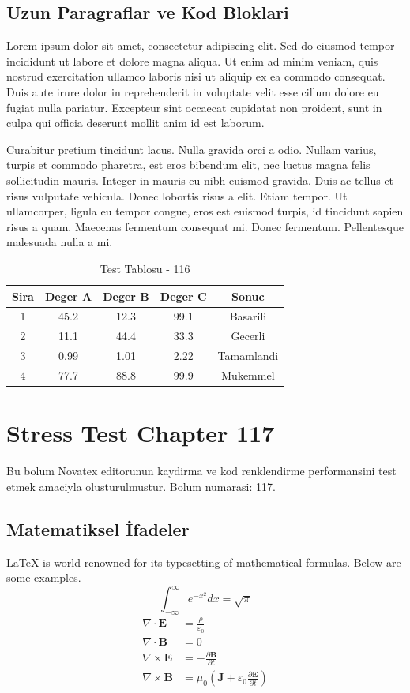 \documentclass[12pt,a4paper]{article}
\begin{document}
\subsection{Uzun Paragraflar ve Kod Bloklari}
Lorem ipsum dolor sit amet, consectetur adipiscing elit. Sed do eiusmod tempor incididunt ut labore et dolore magna aliqua. Ut enim ad minim veniam, quis nostrud exercitation ullamco laboris nisi ut aliquip ex ea commodo consequat. Duis aute irure dolor in reprehenderit in voluptate velit esse cillum dolore eu fugiat nulla pariatur. Excepteur sint occaecat cupidatat non proident, sunt in culpa qui officia deserunt mollit anim id est laborum.

Curabitur pretium tincidunt lacus. Nulla gravida orci a odio. Nullam varius, turpis et commodo pharetra, est eros bibendum elit, nec luctus magna felis sollicitudin mauris. Integer in mauris eu nibh euismod gravida. Duis ac tellus et risus vulputate vehicula. Donec lobortis risus a elit. Etiam tempor. Ut ullamcorper, ligula eu tempor congue, eros est euismod turpis, id tincidunt sapien risus a quam. Maecenas fermentum consequat mi. Donec fermentum. Pellentesque malesuada nulla a mi.

\begin{table}[h!]
\centering
\begin{tabular}{|c|c|c|c|c|}
\hline
\textbf{Sira} & \textbf{Deger A} & \textbf{Deger B} & \textbf{Deger C} & \textbf{Sonuc} \\
\hline
1 & 45.2 & 12.3 & 99.1 & Basarili \\
2 & 11.1 & 44.4 & 33.3 & Gecerli \\
3 & 0.99 & 1.01 & 2.22 & Tamamlandi \\
4 & 77.7 & 88.8 & 99.9 & Mukemmel \\
\hline
\end{tabular}
\caption{Test Tablosu - 116}
\end{table}

\newpage
\section{Stress Test Chapter 117}
Bu bolum Novatex editorunun kaydirma ve kod renklendirme performansini test etmek amaciyla olusturulmustur. Bolum numarasi: 117.

\subsection{Matematiksel İfadeler}
\LaTeX{} is world-renowned for its typesetting of mathematical formulas. Below are some examples.
\begin{equation}
\int_{-\infty}^{\infty} e^{-x^2} dx = \sqrt{\pi}
\end{equation}
\begin{align}
\nabla \cdot \mathbf{E} &= \frac{\rho}{\varepsilon_0} \\
\nabla \cdot \mathbf{B} &= 0 \\
\nabla \times \mathbf{E} &= -\frac{\partial \mathbf{B}}{\partial t} \\
\nabla \times \mathbf{B} &= \mu_0\left(\mathbf{J} + \varepsilon_0 \frac{\partial \mathbf{E}}{\partial t}\right)
\end{align}
\end{document}
